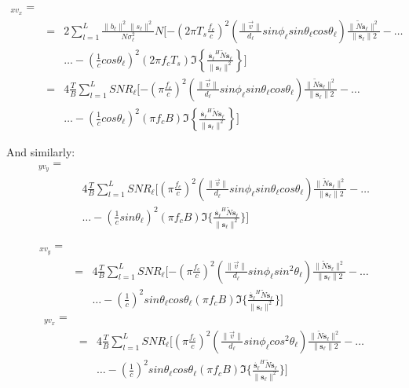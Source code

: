 \documentclass[10pt,a4paper]{report}
\begin{document}
\begin{eqnarray}
[J]_{x v_x} = \\
&=& 2\sum_{l=1}^L\frac{\|b_\ell \|^2\|s_\ell \|^2}{N\sigma_\ell ^2}N[ -\left(2 \pi T_s \frac{f_c}{c}\right)^2\left(\frac{\|\vec{v}\|}{d_\ell } sin \phi_\ell  sin \theta_\ell  cos \theta_\ell \right)\frac{\|\tilde{N}\mathbf{s_\ell }\|^2}{\|\mathbf{s_\ell }\|2} -\dots \nonumber\\
&&\dots -\left(\frac{1}{c}cos \theta_\ell \right)^2(2 \pi f_c T_s) \Im \left\{\frac{\mathbf{\dot{s_\ell }}^H\tilde{N}\mathbf{s_\ell }}{\|\mathbf{s_\ell }\|^2} \right\}]
 \nonumber \\
 &=& 4\frac{T}{B} \sum_{l=1}^L{SNR}_\ell  [ -\left( \pi \frac{f_c}{c}\right)^2\left(\frac{\|\vec{v}\|}{d_\ell } sin \phi_\ell  sin \theta_\ell  cos \theta_\ell \right)\frac{\|\tilde{N}\mathbf{s_\ell }\|^2}{\|\mathbf{s_\ell }\|2} -\dots \nonumber\\
&&\dots -\left(\frac{1}{c}cos \theta_\ell \right)^2( \pi f_c B) \Im \left\{\frac{\mathbf{\dot{s_\ell }}^H\tilde{N}\mathbf{s_\ell }}{\|\mathbf{s_\ell }\|^2} \right\}]
 \nonumber
\end{eqnarray}

And similarly:
\begin{eqnarray}
[J]_{y v_y} = \\
&&4\frac{T}{B} \sum_{l=1}^L{SNR}_\ell  [ \left( \pi \frac{f_c}{c}\right)^2\left(\frac{\|\vec{v}\|}{d_\ell } sin \phi_\ell  sin \theta_\ell  cos \theta_\ell \right)\frac{\|\tilde{N}\mathbf{s_\ell }\|^2}{\|\mathbf{s_\ell }\|2} -\dots \nonumber\\
&&\dots -\left(\frac{1}{c}sin \theta_\ell \right)^2( \pi f_c B) \Im \{\frac{\mathbf{\dot{s_\ell }}^H\tilde{N}\mathbf{s_\ell }}{\|\mathbf{s_\ell }\|^2}\} ]
 \nonumber
\end{eqnarray}

\begin{eqnarray}
[J]_{x v_y} = \\
&=& 4\frac{T}{B} \sum_{l=1}^L{SNR}_\ell  [ -\left( \pi \frac{f_c}{c}\right)^2\left(\frac{\|\vec{v}\|}{d_\ell } sin \phi_\ell  sin^2 \theta_\ell \right)\frac{\|\tilde{N}\mathbf{s_\ell }\|^2}{\|\mathbf{s_\ell }\|2} -\dots \nonumber\\
&&\dots -\left(\frac{1}{c}\right)^2 sin \theta_\ell  cos \theta_\ell ( \pi f_c B) \Im \{ \frac{\mathbf{\dot{s_\ell }}^H\tilde{N}\mathbf{s_\ell }}{\|\mathbf{s_\ell }\|^2} \}]
 \nonumber
\end{eqnarray}
\begin{eqnarray}
[J]_{y v_x} = \\
&=& 4\frac{T}{B} \sum_{l=1}^L{SNR}_\ell  [ \left( \pi \frac{f_c}{c}\right)^2\left(\frac{\|\vec{v}\|}{d_\ell } sin \phi_\ell  cos^2 \theta_\ell \right)\frac{\|\tilde{N}\mathbf{s_\ell }\|^2}{\|\mathbf{s_\ell }\|2} -\dots \nonumber\\
&&\dots -\left(\frac{1}{c}\right)^2 sin \theta_\ell  cos \theta_\ell ( \pi f_c B) \Im \{ \frac{\mathbf{\dot{s_\ell }}^H\tilde{N}\mathbf{s_\ell }}{\|\mathbf{s_\ell }\|^2}\} ]
 \nonumber
\end{eqnarray}
\end{document}
